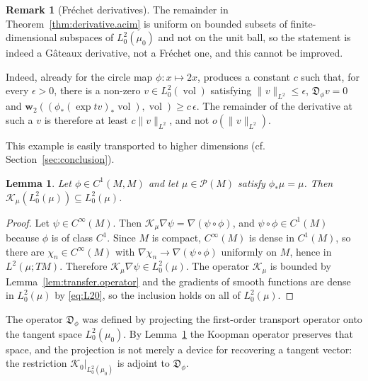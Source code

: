 \documentclass[11pt,reqno]{amsart}
\theoremstyle{plain}
\newtheorem{lem}[thm]{Lemma}
\theoremstyle{definition}
\newtheorem{rmk}[thm]{Remark}
\newcommand{\dw}{\mathbf{w}_2}
\newcommand{\D}{\mathfrak{D}}
\newcommand{\Prob}{\mathcal{P}}
\newcommand{\Koop}{\mathcal{K}}
\DeclareMathOperator{\vol}{vol}
\begin{document}
\begin{rmk}[Fr\'echet derivatives]
    \label{rmk:frechet.derivative}
    The remainder in Theorem~\ref{thm:derivative.acim} is uniform on bounded subsets of finite-dimensional subspaces of \( L^2_0(\mu_0) \) and not on the unit ball, so the statement is indeed a G\^ateaux derivative, not a Fr\'echet one, and this cannot be improved.

    Indeed, already for the circle map \( \phi: x \mapsto 2x \), \cite[Proposition 4.3]{kloeckner_optimal_2013} produces a constant \( c \) such that, for every \( \epsilon>0 \), there is a non-zero \( v\in L^2_0(\vol) \) satisfying \( \lVert v\rVert_{L^2}\le\epsilon \),  \( \D_\phi v=0 \) and \( \dw\left((\phi_\ast(\exp tv)_\ast\vol),\vol\right)\ge c\,\epsilon \).
    The remainder of the derivative at such a \( v \) is therefore at least \( c\lVert v\rVert_{L^2} \), and not \( o(\lVert v\rVert_{L^2}) \).

    This example is easily transported to higher dimensions (cf. Section~\ref{sec:conclusion}).
\end{rmk}



\begin{lem}
\label{lem:koopman.invariance}
    Let \( \phi\in C^1(M,M) \) and let \( \mu\in\Prob(M) \) satisfy \( \phi_\ast\mu=\mu \).
    Then \( \Koop_\mu\left(L^2_0(\mu)\right)\subseteq L^2_0(\mu) \).
\end{lem}

\begin{proof}
    Let \( \psi\in C^\infty(M) \).
    Then \( \Koop_\mu\nabla\psi=\nabla(\psi\circ\phi) \), and \( \psi\circ\phi\in C^1(M) \) because \( \phi \) is of class \( C^1 \).
    Since \( M \) is compact, \( C^\infty(M) \) is dense in \( C^1(M) \), so there are \( \chi_n\in C^\infty(M) \) with \( \nabla\chi_n\to\nabla(\psi\circ\phi) \) uniformly on \( M \), hence in \( L^2(\mu;TM) \).
    Therefore \( \Koop_\mu\nabla\psi\in L^2_0(\mu) \).
    The operator \( \Koop_\mu \) is bounded by Lemma~\ref{lem:transfer.operator} and the gradients of smooth functions are dense in \( L^2_0(\mu) \) by \eqref{eq:L20}, so the inclusion holds on all of \( L^2_0(\mu) \).
\end{proof}

The operator \( \D_\phi \) was defined by projecting the first-order transport operator onto the tangent space \( L^2_0(\mu_0) \).
By Lemma~\ref{lem:koopman.invariance} the Koopman operator preserves that space, and the projection is not merely a device for recovering a tangent vector: the restriction \( \Koop_0|_{L^2_0(\mu_0)} \) is adjoint to \( \D_\phi \).
\end{document}
